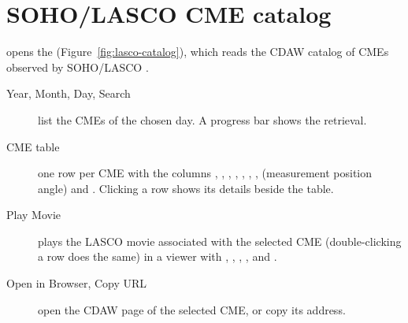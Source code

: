 \section{SOHO/LASCO CME catalog}
\label{sec:lasco-catalog}

 opens the
 (Figure~\ref{fig:lasco-catalog}), which reads the CDAW
catalog of CMEs observed by SOHO/LASCO \parencite{yashiro2004}.


\begin{description}
  \item[Year, Month, Day, Search] list the CMEs of the chosen day. A progress bar shows the
    retrieval.
  \item[CME table] one row per CME with the columns , ,
    , , , ,
    ,  (measurement position angle) and .
    Clicking a row shows its details beside the table.
  \item[Play Movie] plays the LASCO movie associated with the selected CME (double-clicking a
    row does the same) in a viewer with , , ,
    ,  and .
  \item[Open in Browser, Copy URL] open the CDAW page of the selected CME, or copy its
    address.
\end{description}
